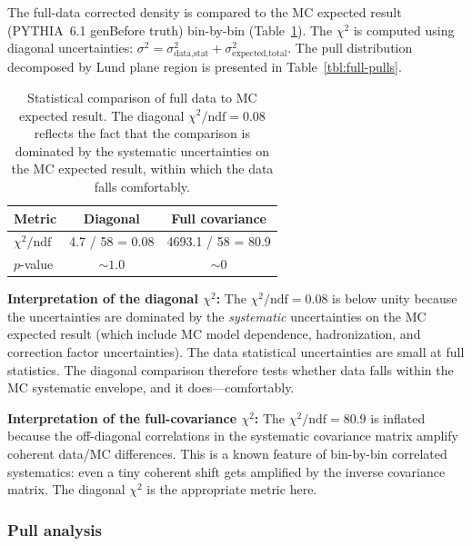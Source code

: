 \documentclass[11pt,a4paper]{article}
\begin{document}
The full-data corrected density is compared to the MC expected result
(PYTHIA~6.1 genBefore truth) bin-by-bin (Table~\ref{tbl:full-chi2}).
The $\chi^2$ is computed using diagonal uncertainties:
$\sigma^2 = \sigma_\text{data,stat}^2 + \sigma_\text{expected,total}^2$.
The pull distribution decomposed by Lund plane region is presented in
Table~\ref{tbl:full-pulls}.

\begin{table}[htbp]
\centering
\caption{Statistical comparison of full data to MC expected result.
  The diagonal $\chi^2/\text{ndf} = 0.08$ reflects the fact that the
  comparison is dominated by the systematic uncertainties on the MC
  expected result, within which the data falls comfortably.}
\label{tbl:full-chi2}
\begin{tabular}{lcc}
\toprule
Metric & Diagonal & Full covariance \\
\midrule
$\chi^2/\text{ndf}$ & 4.7 / 58 = 0.08 & 4693.1 / 58 = 80.9 \\
$p$-value & $\sim 1.0$ & $\sim 0$ \\
\bottomrule
\end{tabular}
\end{table}

\textbf{Interpretation of the diagonal $\chi^2$:}  The
$\chi^2/\text{ndf} = 0.08$ is below unity because the uncertainties are
dominated by the \emph{systematic} uncertainties on the MC expected
result (which include MC model dependence, hadronization, and correction
factor uncertainties).  The data statistical uncertainties are small at
full statistics.  The diagonal comparison therefore tests whether data
falls within the MC systematic envelope, and it does---comfortably.

\textbf{Interpretation of the full-covariance $\chi^2$:}  The
$\chi^2/\text{ndf} = 80.9$ is inflated because the off-diagonal
correlations in the systematic covariance matrix amplify coherent
data/MC differences.  This is a known feature of bin-by-bin correlated
systematics: even a tiny coherent shift gets amplified by the inverse
covariance matrix.  The diagonal $\chi^2$ is the appropriate metric here.

\subsubsection{Pull analysis}
\end{document}
